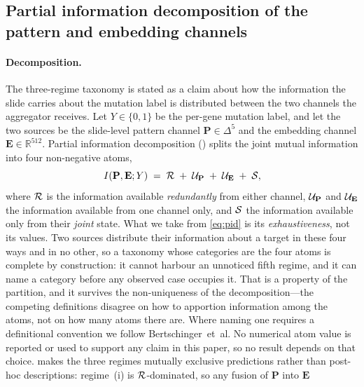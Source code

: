 \subsection*{Partial information decomposition of the pattern and
embedding channels}

\paragraph{Decomposition.}
The three-regime taxonomy is stated as a claim about how the
information the slide carries about the mutation label is
distributed between the two channels the aggregator receives.
Let $Y\in\{0,1\}$ be the per-gene mutation label, and let the two
sources be the slide-level pattern channel $\mathbf{P}\in\Delta^{5}$
and the \ctranspath{} embedding channel
$\mathbf{E}\in\mathbb{R}^{512}$.
Partial information decomposition
(\pid{})\cite{williams2010pid,bertschinger2014unique} splits the
joint mutual information\cite{cover2006elements} into four
non-negative atoms,
\begin{equation}
I\!\left(\mathbf{P},\mathbf{E};Y\right) \;=\;
\mathcal{R} \;+\; \mathcal{U}_{\mathbf{P}} \;+\; \mathcal{U}_{\mathbf{E}} \;+\; \mathcal{S} ,
\label{eq:pid}
\end{equation}
where $\mathcal{R}$ is the information available \emph{redundantly} from
either channel, $\mathcal{U}_{\mathbf{P}}$ and $\mathcal{U}_{\mathbf{E}}$ the
information available from one channel only, and $\mathcal{S}$ the
information available only from their \emph{joint} state.
What we take from \cref{eq:pid} is its \emph{exhaustiveness}, not its
values. Two sources distribute their information about a target in these
four ways and in no other, so a taxonomy whose categories are the four
atoms is complete by construction: it cannot harbour an unnoticed fifth
regime, and it can name a category before any observed case occupies it.
That is a property of the partition, and it survives the
non-uniqueness of the decomposition---the competing definitions disagree
on how to apportion information among the atoms, not on how many atoms
there are. Where naming one requires a definitional convention we follow
Bertschinger~et~al.\cite{bertschinger2014unique} No numerical atom value
is reported or used to support any claim in this paper, so no result
depends on that choice.
 makes the three regimes mutually exclusive
predictions rather than post-hoc descriptions: regime~(i) is
$\mathcal{R}$-dominated, so any fusion of $\mathbf{P}$ into $\mathbf{E}$
